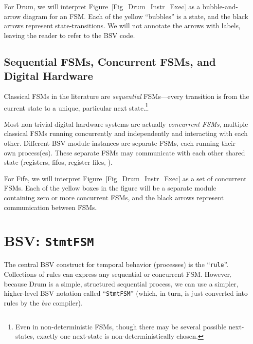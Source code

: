 
For Drum, we will interpret Figure~\ref{Fig_Drum_Instr_Exec} as a
bubble-and-arrow diagram for an FSM.  Each of the yellow ``bubbles''
is a state, and the black arrows represent state-transitions.  We will
not annotate the arrows with labels, leaving the reader to refer to
the BSV code.


\subsection{Sequential FSMs, Concurrent FSMs, and Digital Hardware}


Classical FSMs in the literature are \emph{sequential} FSMs---every
transition is from the current state to a unique, particular next
state.\footnote{Even in non-deterministic FSMs, though there may be
several possible next-states, exactly one next-state is
non-deterministically chosen.}

Most non-trivial digital hardware systems are actually
\emph{concurrent FSMs}, {\ie} multiple classical FSMs running
concurrently and independently and interacting with each other.
Different BSV module instances are separate FSMs, each running their
own process(es).  These separate FSMs may communicate with each other
{\via} shared state (registers, fifos, register files, {\etc}).


For Fife, we will interpret Figure~\ref{Fig_Drum_Instr_Exec} as a set
of concurrent FSMs.  Each of the yellow boxes in the figure will be a
separate module containing zero or more concurrent FSMs, and the black
arrows represent communication between FSMs.


\section{BSV: {\tt StmtFSM}}

\label{Sec_FSMs_StmtFSM}


The central BSV construct for temporal behavior (processes) is the
``\verb|rule|''.  Collections of rules can express any sequential or
concurrent FSM.  However, because Drum is a simple, structured
sequential process, we can use a simpler, higher-level BSV notation
called ``\verb|StmtFSM|'' (which, in turn, is just converted into
rules by the \emph{bsc} compiler).

